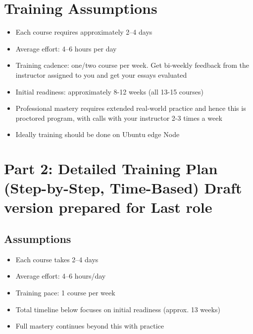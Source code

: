 \documentclass[12pt]{article}
\begin{document}
	\section*{Training Assumptions}
	
	\begin{itemize}
		\item Each course requires approximately 2–4 days
		\item Average effort: 4–6 hours per day
		\item Training cadence: one/two course per week. Get bi-weekly feedback from the instructor assigned to you and get your essays evaluated 
		\item Initial readiness: approximately 8-12 weeks (all 13-15 courses)
		\item Professional mastery requires extended real-world practice and hence this is proctored program, with calls with your instructor 2-3 times a week
		\item Ideally training should be done on Ubuntu edge Node
	\end{itemize}
	
	\newpage
	
	\section*{Part 2: Detailed Training Plan (Step-by-Step, Time-Based) Draft version prepared for Last role}
	
	\subsection*{Assumptions}
	\begin{itemize}
		\item Each course takes 2–4 days
		\item Average effort: 4–6 hours/day
		\item Training pace: 1 course per week
		\item Total timeline below focuses on initial readiness (approx. 13 weeks)
		\item Full mastery continues beyond this with practice
	\end{itemize}
	
	\vspace{0.5cm}
	
\end{document}
